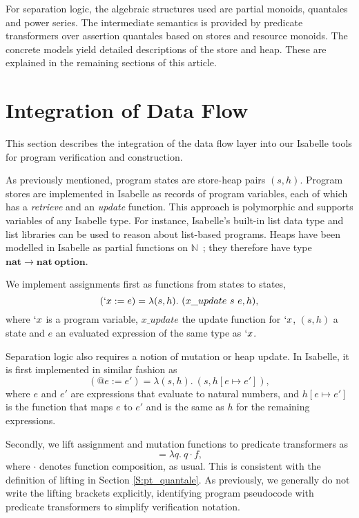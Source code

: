 \documentclass[twoside,runningheads,envcountsame,envcountsect,oribibl,orivec]{llncs}
\newcommand{\predT}[1]{[#1]}
\begin{document}
For separation logic, the algebraic structures used are partial
monoids, quantales and power series. The intermediate semantics is
provided by predicate transformers over assertion quantales based on
stores and resource monoids. The concrete models yield detailed
descriptions of the store and heap. These are explained in the
remaining sections of this article.






\section{Integration of Data Flow}\label{S:data_flow}

This section describes the integration of the data flow layer into our
Isabelle tools for program verification and construction.

As previously mentioned, program states are store-heap pairs $(s, h)$.
Program stores are implemented in Isabelle as records of program
variables, each of which has a \emph{retrieve} and an \emph{update}
function.  This approach is polymorphic and supports variables of any
Isabelle type.  For instance, Isabelle's built-in list data type and
list libraries can be used to reason about list-based programs.  Heaps
have been modelled in Isabelle as partial functions on
$\mathbb{N}$~\cite{MehtaN05,Weber04}; they therefore have type
$\mathbf{nat} \to \mathbf{nat\ option}$.

We implement assignments first as functions from states to states,
\begin{equation*}
	(`x := e) = \lambda (s, h).\ (x\_update\ s\ e, h),
\end{equation*}
where $`x$ is a program variable, $x\_update$ the update function for
$`x$, $(s, h)$  a state and $e$ an evaluated expression of the same type as $`x$.

Separation logic also requires a notion of mutation or heap update.
In Isabelle, it is first implemented in similar fashion as
\begin{equation*}
	(@e := e') = \lambda (s, h).\ (s, h[e \mapsto e']),
\end{equation*}
where $e$ and $e'$ are expressions that evaluate to natural numbers,
and $h[e \mapsto e']$ is the function that maps $e$ to $e'$ and is the
same as $h$ for the remaining expressions.

Secondly, we lift assignment and mutation functions to
predicate transformers as
\begin{equation*}
	\predT{f} = \lambda q.\ q \cdot f,
\end{equation*}
where $\cdot$ denotes function composition, as usual. This is
consistent with the definition of lifting in Section
\ref{S:pt_quantale}. As previously, we generally do not write the
lifting brackets explicitly, identifying program pseudocode with
predicate transformers to simplify verification notation.
\end{document}
